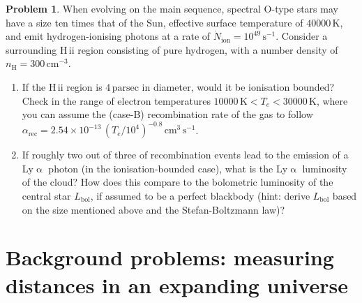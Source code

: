 \documentclass{article}
\newcommand{\Lya}{{Ly\ensuremath{\upalpha}}\xspace}
\newcommand{\HII}{\hbox{H\,{\sc ii}}\xspace}
\theoremstyle{definition}
\newtheorem{problem}{Problem}[section]
\begin{document}
\begin{problem}
    \label{prob:HII_region}
    When evolving on the main sequence, spectral O-type stars may have a size ten times that of the Sun, effective surface temperature of $\num{40000} \, \mathrm{K}$, and emit hydrogen-ionising photons at a rate of $\dot{N}_\text{ion} = 10^{49} \, \mathrm{s^{-1}}$. Consider a surrounding \HII region consisting of pure hydrogen, with a number density of $n_\mathrm{H} = 300 \, \mathrm{cm^{-3}}$.
    \begin{enumerate}[label=(\alph*)]
        \item If the \HII region is $4 \, \mathrm{parsec}$ in diameter, would it be ionisation bounded? Check in the range of electron temperatures $\num{10000} \, \mathrm{K} < T_e < \num{30000} \, \mathrm{K}$, where you can assume the (case-B) recombination rate of the gas to follow $\alpha_\text{rec} = 2.54 \times 10^{-13} \, (T_e/10^4)^{-0.8} \, \mathrm{cm^3 \, s^{-1}}$.
        \item If roughly two out of three of recombination events lead to the emission of a \Lya photon (in the ionisation-bounded case), what is the \Lya luminosity of the cloud? How does this compare to the bolometric luminosity of the central star $L_\text{bol}$, if assumed to be a perfect blackbody (hint: derive $L_\text{bol}$ based on the size mentioned above and the Stefan-Boltzmann law)?
    \end{enumerate}
\end{problem}

\section{Background problems: measuring distances in an expanding universe}
\end{document}
